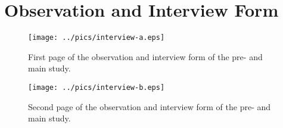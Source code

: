 \chapter{Observation and Interview Form}
\label{appendix_form}

\begin{figure}[H]%
\texttt{[image: ../pics/interview-a.eps]}%
\caption*{First page of the observation and interview form of the pre- and main study.}%
\end{figure}

\begin{figure}[h!]%
\texttt{[image: ../pics/interview-b.eps]}%
\caption*{Second page of the observation and interview form of the pre- and main study.}%
\end{figure}
